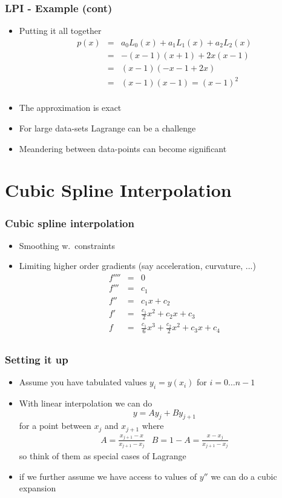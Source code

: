 \documentclass[10pt]{beamer}
\begin{document}
\begin{frame}
  \frametitle{LPI - Example (cont)}
  \begin{itemize}
  \item Putting it all together
    \[
      \begin{array}{lll}
        p(x) & = & a_0 L_0(x) + a_1 L_1(x) + a_2 L_2(x)\\
             & = & -(x-1)(x+1) + 2 x (x-1) \\
             & = & (x-1) ( -x - 1 + 2x)\\
             & = & (x-1) (x-1) = (x-1)^2\\
      \end{array}
    \] \pause
    \item The approximation is exact
    \item For large data-sets Lagrange can be a challenge
    \item Meandering between data-points can become significant
  \end{itemize}
\end{frame}

\section{Cubic Spline Interpolation}

\begin{frame}
  \frametitle{Cubic spline interpolation}
  \begin{itemize}
  \item Smoothing w.\ constraints 
  \item Limiting higher order gradients (say acceleration, curvature, ...)
    \[
      \begin{array}{lll}
        f'''' & = & 0\\
        f'''  & = & c_1\\
        f''   & = & c_1 x + c_2\\
        f'    & = & \frac{c_1}{2} x^2 + c_2 x + c_ 3\\
        f     & = & \frac{c_1}{6} x^3 + \frac{c_2}{2} x^2 + c_3 x + c_4\\                    
      \end{array}
    \]
  \end{itemize}
\end{frame}
\begin{frame}
  \frametitle{Setting it up}
  \begin{itemize}
  \item Assume you have tabulated values $y_i = y(x_i)$ for $i = 0 \ldots n-1$
  \item With linear interpolation we can do
    \[
      y = A y_j + B y_{j+1}
    \] for a point between $x_j$ and $x_{j+1}$ where
    \[
      \begin{array}{ll}
        A = \frac{x_{j+1} - x}{x_{j+1}-x_j} & B = 1-A = \frac{x - x_j}{x_{j+1} - x_j}
      \end{array}
    \] so think of them as special cases of Lagrange
  \item if we further assume we have access to values of $y''$ we can do a cubic expansion
  \end{itemize}
\end{frame}
\end{document}
